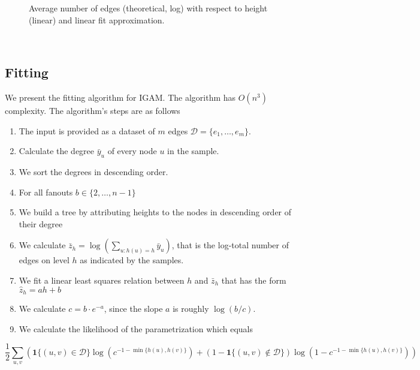 \documentclass[11pt]{article}
\providecommand{\tightlist}{%
      \setlength{\itemsep}{0pt}\setlength{\parskip}{0pt}}
\begin{document}
    \begin{figure}
    \begin{center}
     \caption{Average number of edges (theoretical, log) with respect to height (linear) and linear fit approximation.}
    \end{center}
    \end{figure}
    { \hspace*{\fill} \\}
    
    \hypertarget{fitting}{%
\subsection{Fitting}\label{fitting}}

We present the fitting algorithm for IGAM. The algorithm has \(O(n^3)\)
complexity. The algorithm's steps are as follows

\begin{enumerate}
\def\labelenumi{\arabic{enumi}.}
\tightlist
\item
  The input is provided as a dataset of \(m\) edges
  \(\mathcal D = \{ e_1, \dots, e_m \}\).
\item
  Calculate the degree \(\bar y_u\) of every node \(u\) in the sample.
\item
  We sort the degrees in descending order.
\item
  For all fanouts \(b \in \{ 2, \dots, n - 1 \}\)
\item
  We build a tree by attributing heights to the nodes in descending
  order of their degree
\item
  We calculate
  \(\bar z_h = \log \left ( \sum_{u: h(u) = h} \bar y_u \right )\), that
  is the log-total number of edges on level \(h\) as indicated by the
  samples.
\item
  We fit a linear least squares relation between \(h\) and \(\bar z_h\)
  that has the form \(\hat z_h = a h + b\)
\item
  We calculate \(c = b \cdot e^{-a}\), since the slope \(a\) is roughly
  \(\log (b / c)\).\\
\item
  We calculate the likelihood of the parametrization which equals
\end{enumerate}


\[ \frac 1 2 \sum_{u, v} \left ( \mathbf 1 \{(u, v) \in \mathcal D \} \log ( c^{-1 - \min \{ h(u), h(v) \}}) + (1 - \mathbf 1 \{ (u, v) \notin \mathcal D \}) \log (1 - c^{-1 - \min \{ h(u), h(v) \}} ) \right )  \]
\end{document}

